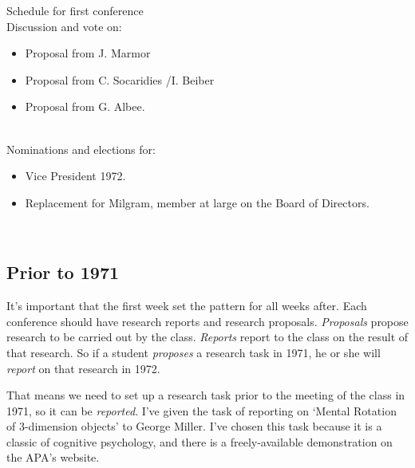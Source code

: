 \begin{refsection}
\begin{apatextbox}{Schedule for first conference}
\\

Discussion and vote on: \\

\begin{itemize}
\item Proposal from J. Marmor

\item Proposal from C. Socaridies \slash  I. Beiber

\item Proposal from G. Albee.

\end{itemize}

\\Nominations and elections for:\\

\begin{itemize}
\item Vice President 1972.

\item Replacement for Milgram, member at large on the Board of Directors.

\end{itemize}

\\

\label{sample:firstconference}
 \end{apatextbox}


 

\newpage

\subsection{Prior to 1971}
\label{priorto1971}

It’s important that the first week set the pattern for all weeks after. Each conference should have research reports and research proposals. \emph{Proposals} propose research to be carried out by the class. \emph{Reports} report to the class on the result of that research. So if a student \emph{proposes} a research task in 1971, he or she will \emph{report} on that research in 1972.

That means we need to set up a research task prior to the meeting of the class in 1971, so it can be \emph{reported}. I’ve given the task of reporting on ‘Mental Rotation of 3-dimension objects’ to George Miller. I’ve chosen this task because it is a classic of cognitive psychology, and there is a freely-available demonstration on the APA’s website.


\end{refsection}
